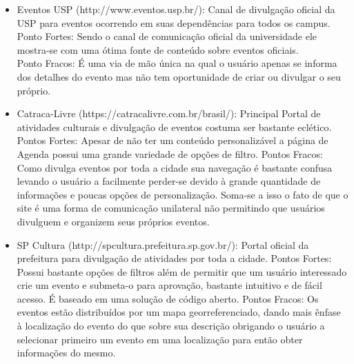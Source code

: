 \begin{itemize}
\item{Eventos USP (http://www.eventos.usp.br/):}
Canal de divulgação oficial da USP para eventos ocorrendo em suas dependências para todos os campus.\\
Ponto Fortes: Sendo o canal de comunicação oficial da universidade ele mostra-se com uma ótima fonte de conteúdo sobre eventos oficiais.\\
Ponto Fracos: É uma via de mão única na qual o usuário apenas se informa dos detalhes do evento mas não tem oportunidade de criar ou divulgar o seu próprio.
\item {Catraca-Livre (https://catracalivre.com.br/brasil/):} Principal Portal de atividades culturais e divulgação de eventos costuma ser bastante eclético. \\
Pontos Fortes: Apesar de não ter um conteúdo personalizável a página de Agenda possui uma grande variedade de opções de filtro.
Pontos Fracos: Como divulga eventos por toda a cidade sua navegação é bastante confusa levando o usuário a facilmente perder-se devido à grande quantidade de informações e poucas opções de personalização. Soma-se a isso o fato de que o site é uma forma de comunicação unilateral não permitindo que usuários divulguem e organizem seus próprios eventos.\\
\item {SP Cultura (http://spcultura.prefeitura.sp.gov.br/):} Portal oficial da prefeitura para divulgação de atividades por toda a cidade.
Pontos Fortes: Possui bastante opções de filtros além de permitir que um usuário interessado crie um evento e submeta-o para aprovação, bastante intuitivo e de fácil acesso. É baseado em uma solução de código aberto.
Pontos Fracos: Os eventos estão distribuídos por um mapa georreferenciado, dando mais ênfase à localização do evento do que sobre sua descrição obrigando o usuário a selecionar primeiro um evento em uma localização para então obter informações do mesmo.
\end{itemize}
